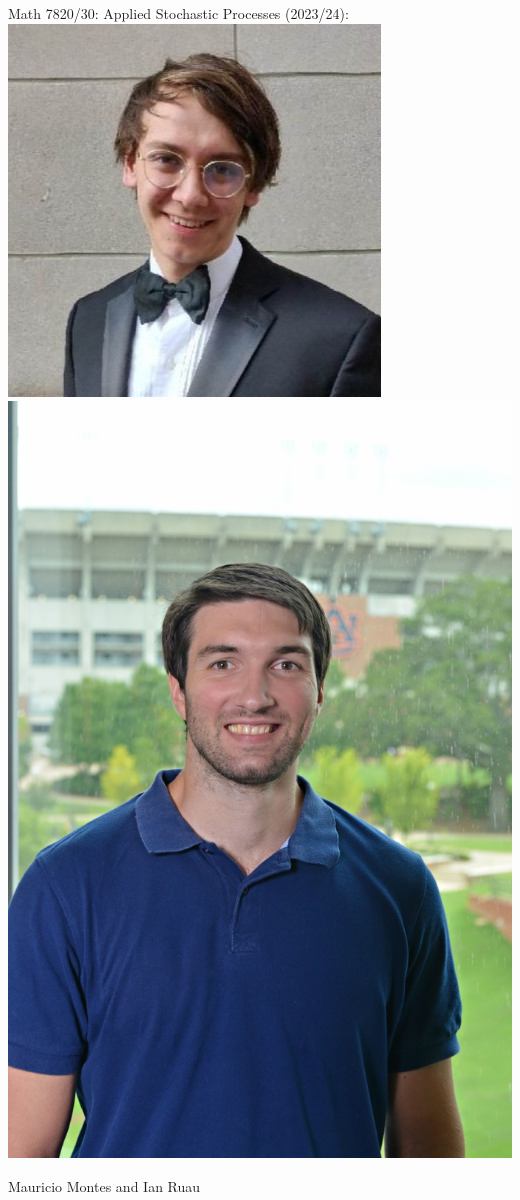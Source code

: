 \documentclass[9pt,table,xcolor=dvipsnames]{beamer}
\begin{document}
\begin{frame}[noframenumbering] %
  \titlepage
\end{frame}
\begin{frame}[fragile] %
  \begin{center}
    Math 7820/30: Applied Stochastic Processes (2023/24):
    \includegraphics[scale=0.30]{./figs/mau.jpeg}
    \includegraphics[scale=0.50]{./figs/ruau.jpg}
    \bigskip

    Mauricio Montes and Ian Ruau
  \end{center}
\end{frame}
\end{document}
